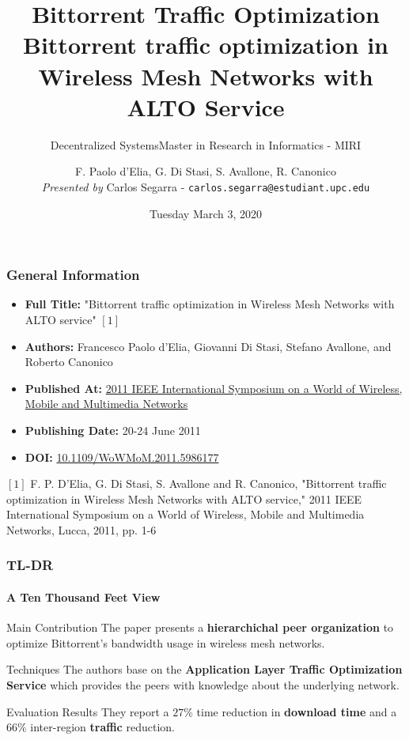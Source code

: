 \documentclass[10pt,    %
    english,            %
    xcolor=table,       %
    envcountsect,        %
    aspectratio=169     %
]{beamer}
\subtitle{Decentralized Systems} %
\title[Decentralized Systems] %
    {\normalsize Bittorrent Traffic Optimization \\ \Large Bittorrent traffic optimization in \\ \Large Wireless Mesh Networks with ALTO Service }
\subtitle{Master in Research in Informatics - MIRI}
\date[March 3, 2020] %
    {Tuesday March 3, 2020}
\author[] %
{F. Paolo d'Elia, G. Di Stasi, S. Avallone, R. Canonico \\\small \textit{Presented by} Carlos Segarra - \texttt{carlos.segarra@estudiant.upc.edu}}
\begin{document}
\begin{frame}
  \titlepage
\end{frame}

\begin{frame}
    \frametitle{General Information}

    \begin{itemize}
        \item \textbf{Full Title:} "Bittorrent traffic optimization in Wireless Mesh Networks with ALTO service" $[1]$
        \item \textbf{Authors:} Francesco Paolo d'Elia, Giovanni Di Stasi, Stefano Avallone, and Roberto Canonico
        \item \textbf{Published At:} \href{https://ieeexplore.ieee.org/xpl/conhome/5976314/proceeding}{2011 IEEE International Symposium on a World of Wireless, Mobile and Multimedia Networks}
        \item \textbf{Publishing Date:} 20-24 June 2011
        \item \textbf{DOI:} \href{https://doi.org/10.1109/WoWMoM.2011.5986177}{10.1109/WoWMoM.2011.5986177}
    \end{itemize}


    \small
    \begin{description}
        \item $[1]$ F. P. D'Elia, G. Di Stasi, S. Avallone and R. Canonico, "Bittorrent traffic optimization in Wireless Mesh Networks with ALTO service," 2011 IEEE International Symposium on a World of Wireless, Mobile and Multimedia Networks, Lucca, 2011, pp. 1-6
    \end{description}
 

\end{frame}

\begin{frame}
    \frametitle{TL-DR}
    \framesubtitle{A Ten Thousand Feet View}

    \vspace{-25pt}

    \begin{alertblock}{Main Contribution}
        The paper presents a \textbf{hierarchichal peer organization} to optimize Bittorrent's bandwidth usage in wireless mesh networks.
    \end{alertblock}

    \begin{block}{Techniques}
        The authors base on the \textbf{Application Layer Traffic Optimization Service} which provides the peers with knowledge about the underlying network.
    \end{block}

    \begin{alertblock}{Evaluation Results}
        They report a $27\%$ time reduction in \textbf{download time} and a $66\%$ inter-region \textbf{traffic} reduction.
    \end{alertblock}

\end{frame}
\end{document}
